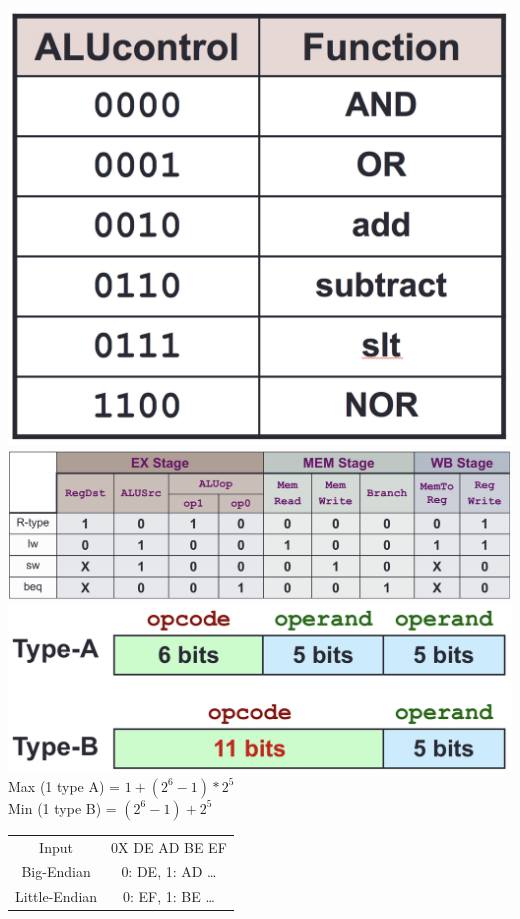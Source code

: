 \documentclass[a4paper]{article} \usepackage[backend=biber, style=numeric, sorting=none]{biblatex}
\begin{document}
\begin{multicols*}{4}
\begin{center}
{\centering \includegraphics[scale=0.13]{ALUControl}}
\\ {\centering \includegraphics[angle=90,origin=c,scale=0.25]{InstructionControl}}
\\ {\centering \includegraphics[scale=0.25]{expandingOpcode} }
\\ Max (1 type A) = $1 + (2^6 - 1) * 2^5$
\\ Min (1 type B) = $(2^6 - 1) + 2^5$

\vspace{5mm} %
\begin{tabular}{ |c c| } 
 \hline
 Input & 0X DE AD BE EF  \\ 
 Big-Endian & 0: DE, 1: AD \dots  \\ 
 Little-Endian & 0: EF, 1: BE \dots  \\ 
 \hline
\end{tabular}
\end{center}

    \end{multicols*}
\end{document}
